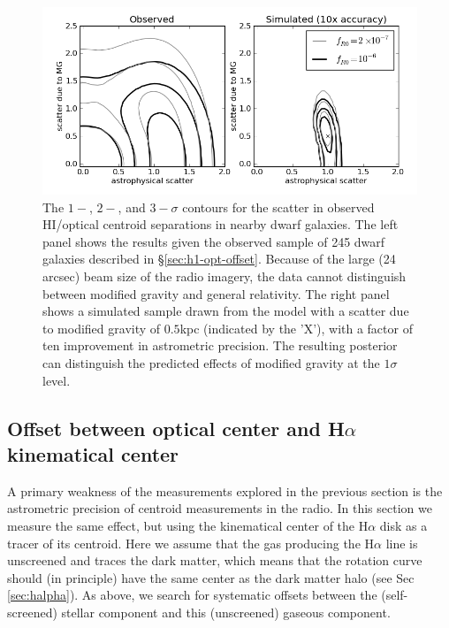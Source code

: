 \documentclass[useAMS,usenatbib,twocolumn]{mn2e}
\newcommand{\ha}{H$\alpha$}
\begin{document}
\begin{figure}
\centering
\includegraphics[scale=0.7]{figures/Offset_HI_optical_jake.png}

\caption{The $1-$, $2-$, and $3-\sigma$ contours for the scatter in observed
  HI/optical centroid separations in nearby dwarf galaxies.  The left panel
  shows the results given the observed sample of 245 dwarf galaxies described
  in \S\ref{sec:h1-opt-offset}.  Because of the large (24 arcsec) beam size of
  the radio imagery, the data cannot distinguish between modified gravity and
  general relativity.  The right panel shows a simulated sample drawn from the
  model with a scatter due to modified gravity of $0.5$kpc (indicated by the
'X'), %
  with a factor of ten improvement in astrometric precision.  The resulting
  posterior can distinguish the predicted effects of modified gravity at the
  $1\sigma$ level.}
\label{fig:offset-analysis}
\end{figure}


\subsection{Offset between optical center and \ha{} kinematical center}
\label{sec:kinematical}
A primary weakness of the measurements explored in the previous section is
the astrometric precision of centroid measurements in the radio.  In
this section we measure the same effect, but using the kinematical
center of the \ha{} disk as a tracer of its centroid.  Here we assume that
the gas producing the \ha{} line is unscreened and traces the dark matter,
which means that the rotation curve should (in principle) have the same
center as the dark matter halo (see Sec \ref{sec:halpha}).
As above, we search for systematic offsets
between the (self-screened) stellar component and this (unscreened) gaseous
component.
\end{document}
